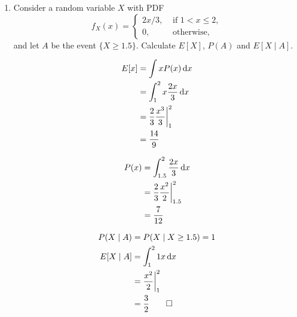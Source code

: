 \documentclass[paper=usletter, fontsize=12pt]{article}
\begin{document}
\begin{enumerate}
\begin{enumerate}
\begin{cproof}
            \end{cproof}

        \end{enumerate}

        \item Consider a random variable $X$ with PDF
        \begin{equation*}
            f_X(x) = \begin{cases}
                2x/3, & \text{ if } 1 < x \le 2,\\
                0, & \text{ otherwise, }
            \end{cases}
        \end{equation*}
        and let $A$ be the event $\{X \ge 1.5\}$. Calculate $E[X]$, $P(A)$ and
        $E[X \mid A]$.
        \begin{cproof}

            \begin{align*}
                E[x] & = \int xP(x)\mathop{}\!\mathrm{d} x\\
                &= \int_{1}^{2}x\frac{2x}{3}\mathop{}\!\mathrm{d} x\\
                & = \frac{2}{3}\frac{x^3}{3}\bigg\vert_{1}^{2}\\
                & = \frac{14}{9}
            \end{align*}
            \endgroup

            \begin{align*}
                P(x) &= \int_{1.5}^{2}\frac{2x}{3}\mathop{}\!\mathrm{d} x\\
                & = \frac{2}{3}\frac{x^2}{2}\bigg\vert_{1.5}^{2}\\
                & = \frac{7}{12}
            \end{align*}
            \endgroup

            \begin{align*}
                P(X \mid A) &= P(X \mid X \ge 1.5) = 1\\
                E[X \mid A] &= \int_{1}^{2}1x\mathop{}\!\mathrm{d} x\\
                & = \frac{x^2}{2}\bigg\vert_{1}^{2}\\
                & = \frac{3}{2} \qedhere
            \end{align*}
            \endgroup

        \end{cproof}


\end{enumerate}
\end{document}
